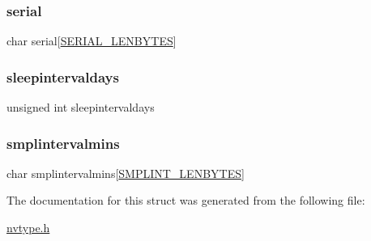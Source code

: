\subsubsection{\texorpdfstring{serial}{serial}}
{\footnotesize\ttfamily char serial\mbox{[}\mbox{\hyperlink{nvtype_8h_a09589b0f4cf4e32679b6dc064903edef}{S\+E\+R\+I\+A\+L\+\_\+\+L\+E\+N\+B\+Y\+T\+ES}}\mbox{]}}

\mbox{\label{structnvstruct_a7535c524cca52dcf1e60b1e6762fea4c}} 
\subsubsection{\texorpdfstring{sleepintervaldays}{sleepintervaldays}}
{\footnotesize\ttfamily unsigned int sleepintervaldays}

\mbox{\label{structnvstruct_a34de27bbd20aa5f15e4e4482ce5a0309}} 
\subsubsection{\texorpdfstring{smplintervalmins}{smplintervalmins}}
{\footnotesize\ttfamily char smplintervalmins\mbox{[}\mbox{\hyperlink{nvtype_8h_a44d3fb460b6c9383a2b3248544aa13d0}{S\+M\+P\+L\+I\+N\+T\+\_\+\+L\+E\+N\+B\+Y\+T\+ES}}\mbox{]}}



The documentation for this struct was generated from the following file\+:\begin{DoxyCompactItemize}
\item 
\mbox{\hyperlink{nvtype_8h}{nvtype.\+h}}\end{DoxyCompactItemize}
